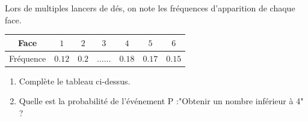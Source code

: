 \begin{pageAD}
 
Lors de multiples lancers de dés, on note les fréquences d'apparition de chaque face. 

\begin{tabular}{|c|c|c|c|c|c|c|}
\hline 
Face & $1$ & $2$ & $3$ & $4$  & $5$ & $6$ \\ 
\hline 
Fréquence & $0.12$ & $0.2$ & $\ldots\ldots$ & $0.18$  & $0.17$ & $0.15$ \\ 
\hline 
\end{tabular}

\begin{enumerate}
\item Complète le tableau ci-dessus.
\item Quelle est la probabilité de l'événement P :"Obtenir un nombre inférieur à 4" ?

\end{enumerate}

 

\end{pageAD} %
%
%
%
%
%
% 
%
%
%
%
%
%
%
%
%
%
%
%
%
%
% 
%
%
%
